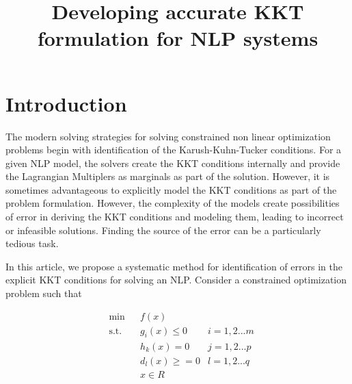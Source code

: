 \documentclass{article}
\title{Developing accurate KKT formulation for NLP systems}
\begin{document}
\section{Introduction}
The modern solving strategies for solving constrained non linear optimization problems begin with identification of the Karush-Kuhn-Tucker conditions. For a given NLP model, the solvers create the KKT conditions internally and provide the Lagrangian Multiplers as marginals as part of the solution. However, it is sometimes advantageous to explicitly model the KKT conditions as part of the problem formulation. However, the complexity of the models create possibilities of error in deriving the KKT conditions and modeling them, leading to incorrect or infeasible solutions. Finding the source of the error can be a particularly tedious task. 

In this article, we propose a systematic method for identification of errors in the explicit KKT conditions for solving an NLP. Consider a constrained optimization problem such that 

\begin{equation}
\begin{aligned}
&	\min 
& & f(x) \\
& \text{s.t.} & & 	 g_{i}(x) \leqslant 0	&	i = 1,2...m \\
& & &			h_{k}(x) = 0	 &	j = 1,2...p \\
& & &			d_{l}(x) \geqslant =0		&	l = 1,2...q \\
& & &			x \in \!R
\end{aligned}
\end{equation} 
\end{document}
